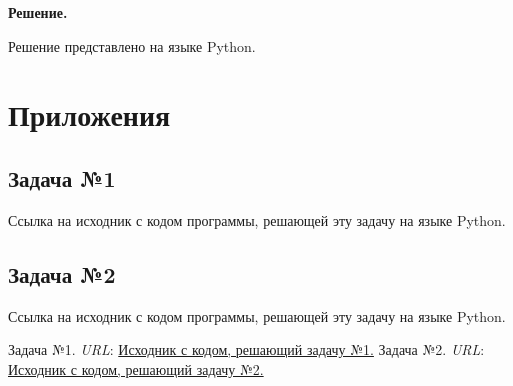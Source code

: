 \documentclass[12pt]{article}
\begin{document}
	\textbf{Решение.}
	
	Решение представлено на языке Python.
	\newpage
	
	\section*{Приложения}
	
	\subsection*{Задача №1}
	
	Ссылка на исходник с кодом программы, решающей эту задачу на языке Python. \cite{TaskNumber1}
	
	\subsection*{Задача №2}
	
	Ссылка на исходник с кодом программы, решающей эту задачу на языке Python. \cite{TaskNumber2}
	\newpage
	
	\begin{thebibliography}{99}
		Задача №1. \textit{URL}: \href{https://colab.research.google.com/drive/1hU3V-uFTl9Eqq9hKGlbg4017R-LNO2Ed?usp=sharing}{Исходник с кодом, решающий задачу №1.}
		Задача №2. \textit{URL}: \href{https://colab.research.google.com/drive/1jZ2odN8TAdEDsBw6dNhFYbSYFFkQi2u0?usp=sharing}{Исходник с кодом, решающий задачу №2.}
	\end{thebibliography}
	
\end{document}
